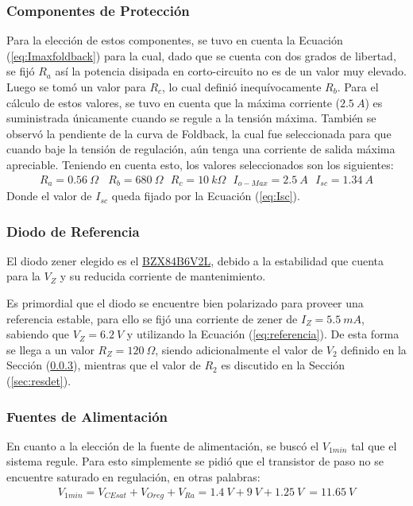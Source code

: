 \subsubsection{Componentes de Protección}
Para la elección de estos componentes, se tuvo en cuenta la Ecuación (\ref{eq:Imaxfoldback}) para la cual, dado que se cuenta con dos grados de libertad, se fijó $R_a$ así la potencia disipada en corto-circuito no es de un valor muy elevado. Luego se tomó un valor para $R_c$, lo cual definió inequívocamente $R_b$. Para el cálculo de estos valores, se tuvo en cuenta que la máxima corriente ($2.5 \ A$) es suministrada únicamente cuando se regule a la tensión máxima. También se observó la pendiente de la curva de Foldback, la cual fue seleccionada para que cuando baje la tensión de regulación, aún tenga una corriente de salida máxima apreciable. Teniendo en cuenta esto, los valores seleccionados son los siguientes:
\begin{align}
R_a=0.56 \ \Omega  \ \ \ \ R_b=680 \ \Omega \ \ \ R_c=10 \ k\Omega \ \ \ I_{o-Max}=2.5 \ A \ \ \ I_{sc}= 1.34 \ A
\end{align}
Donde el valor de $I_{sc}$ queda fijado por la Ecuación (\ref{eq:Isc}).

\subsubsection{Diodo de Referencia}
El diodo zener elegido es el \href{https://d1d2qsbl8m0m72.cloudfront.net/en/products/databook/datasheet/discrete/diode/zener/bzx84b6v2lt116-e.pdf}{BZX84B6V2L},
debido a la estabilidad que cuenta para la $V_Z$ y su reducida corriente de mantenimiento.

Es primordial que el diodo se encuentre bien polarizado para proveer una referencia estable, para ello se fijó una corriente de zener de $I_Z =5.5 \ mA$, sabiendo que $V_Z=6.2 \ V$ y utilizando la Ecuación (\ref{eq:referencia}). De esta forma se llega a un valor $R_Z=120 \ \Omega$, siendo adicionalmente el valor de $V_2$ definido en la Sección (\ref{sec:fuentes}), mientras que el valor de $R_2$ es discutido en la Sección (\ref{sec:resdet}).

\subsubsection{Fuentes de Alimentación}
\label{sec:fuentes}
En cuanto a la elección de la fuente de alimentación, se buscó el $V_{1min}$ tal que el sistema regule. Para esto simplemente se pidió que el transistor de paso no se encuentre saturado en regulación, en otras palabras:
\begin{align}
V_{1min}=V_{CEsat}+V_{Oreg}+V_{Ra}= 1.4 \ V+9 \ V +1.25 \ V \ =11.65 \ V
\end{align}

